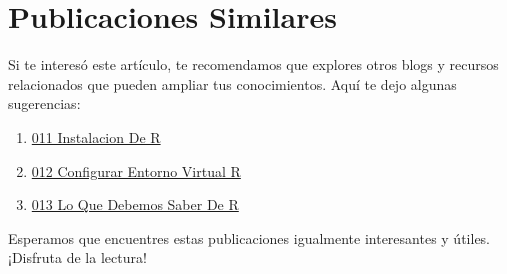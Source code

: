 \documentclass[
  man,
  floatsintext,
  longtable,
  a4paper,
  nolmodern,
  notxfonts,
  notimes,
  12pt,
  colorlinks=true,linkcolor=blue,citecolor=blue,urlcolor=blue]{apa7}
\providecommand{\tightlist}{%
  \setlength{\itemsep}{0pt}\setlength{\parskip}{0pt}}
\begin{document}
\section{Publicaciones Similares}\label{publicaciones-similares}

Si te interesó este artículo, te recomendamos que explores otros blogs y
recursos relacionados que pueden ampliar tus conocimientos. Aquí te dejo
algunas sugerencias:

\begin{enumerate}
\def\labelenumi{\arabic{enumi}.}
\tightlist
\item
  \href{https://numerus-scriptum.netlify.app/r/2020-06-10-011-instalacion-de-r/index.pdf}{}
  \href{https://numerus-scriptum.netlify.app/r/2020-06-10-011-instalacion-de-r}{011
  Instalacion De R}
\item
  \href{https://numerus-scriptum.netlify.app/r/2020-06-10-012-configurar-entorno-virtual-r/index.pdf}{}
  \href{https://numerus-scriptum.netlify.app/r/2020-06-10-012-configurar-entorno-virtual-r}{012
  Configurar Entorno Virtual R}
\item
  \href{https://numerus-scriptum.netlify.app/r/2020-06-10-013-lo-que-debemos-saber-de-r/index.pdf}{}
  \href{https://numerus-scriptum.netlify.app/r/2020-06-10-013-lo-que-debemos-saber-de-r}{013
  Lo Que Debemos Saber De R}
\end{enumerate}

Esperamos que encuentres estas publicaciones igualmente interesantes y
útiles. ¡Disfruta de la lectura!
\end{document}
